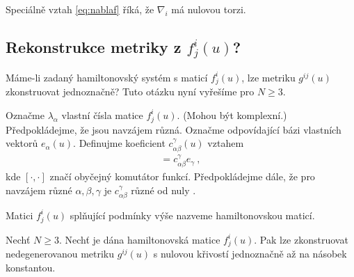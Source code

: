 Speciálně vztah \eqref{eq:nablaf} říká, že $\nabla_i$ má nulovou torzi.


\subsection{Rekonstrukce metriky z $f^i_j(u)$?}

Máme-li zadaný hamiltonovský systém s maticí $f^i_j(u)$, lze metriku $g^{ij}(u)$ zkonstruovat jednoznačně? Tuto otázku nyní vyřešíme pro $N \geq 3$. 

Označme $\lambda_\alpha$ vlastní čísla matice $f^i_j(u)$. (Mohou být komplexní.) Předpokládejme, že jsou navzájem různá. Označme odpovídající bázi vlastních vektorů $e_\alpha(u)$. Definujme koeficient $c^\gamma_{\alpha \beta}(u)$ vztahem
\begin{align}
    [e_\alpha,e_\beta] = c^\gamma_{\alpha \beta} e_\gamma \:,
\end{align}
kde $[\cdot,\cdot]$ značí obyčejný komutátor funkcí. Předpokládejme dále, že pro navzájem různé $\alpha, \beta, \gamma$ je $c^\gamma_{\alpha \beta}$ různé od nuly .

\begin{definition}
    Matici $f^i_j(u)$ splňující podmínky výše nazveme hamiltonovskou maticí.
\end{definition}

\begin{theorem}
    Nechť $N \geq 3$. Nechť je dána hamiltonovská matice $f^i_j(u)$. Pak lze zkonstruovat nedegenerovanou metriku $g^{ij}(u)$ s nulovou křivostí jednoznačně až na násobek konstantou.
\end{theorem}

